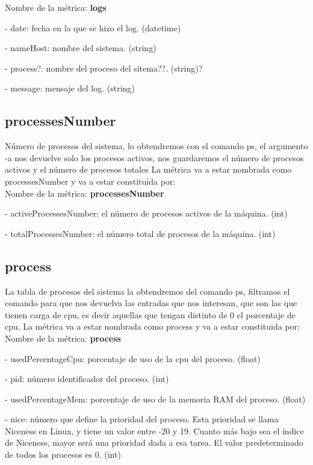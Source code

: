 \documentclass[ spanish, a4paper, 12pt, oneside]{report}
\begin{document}
Nombre de la métrica: \textbf{logs}

\hyp{} date: fecha en la que se hizo el log. (datetime)

\hyp{} nameHost: nombre del sistema. (string)

\hyp{} process?: nombre del proceso del sitema??. (string)?

\hyp{} message: mensaje del log. (string)

\subsection{processesNumber}
Número de procesos del sistema, lo obtendremos con el comando ps, el argumento -a nos devuelve solo los 
procesos activos, nos guardaremos el número de procesos activos y el número de procesos totales
La métrica va a estar nombrada como processesNumber y va a estar constituida por:\\
 
Nombre de la métrica: \textbf{processesNumber}
 
\hyp{} activeProcessesNumber: el número de procesos activos de la máquina. (int)
 
\hyp{} totalProcessesNumber: el número total de procesos de la máquina. (int)

\subsection{process}
La tabla de procesos del sistema la obtendremos del comando ps, filtramos el comando para que nos devuelva 
las entradas que nos interesan, que son las que tienen carga de cpu, es decir aquellas que tengan distinto de 0 el porcentaje de cpu.
La métrica va a estar nombrada como process y va a estar constituida por:\\
  
Nombre de la métrica: \textbf{process}
  
\hyp{} usedPercentageCpu: porcentaje de uso de la cpu del proceso. (float)

\hyp{} pid: número identificador del proceso. (int)
  
\hyp{} usedPercentageMem: porcentaje de uso de la memoria RAM del proceso. (float)
  
\hyp{} nice: número que define la prioridad del proceso. Esta prioridad se llama Niceness en Linux, 
y tiene un valor entre -20 y 19. Cuanto más bajo sea el índice de Niceness, mayor será una prioridad dada a esa tarea.
El valor predeterminado de todos los procesos es 0. (int)
\end{document}
